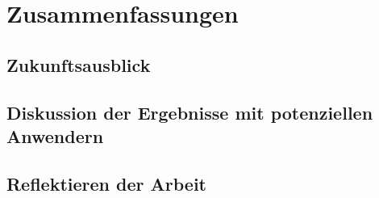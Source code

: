\chapter{Zusammenfassungen}

\section{Zukunftsausblick}
\section{Diskussion der Ergebnisse mit potenziellen Anwendern}
\section{Reflektieren der Arbeit}